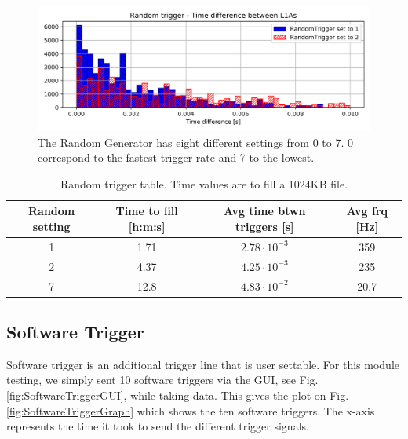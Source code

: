 \begin{figure}[htbp!] 
\centering    
\includegraphics[width=\textwidth]{Raster/RandomTriggerTimeDifferences.png}
\caption[Random Trigger]{The Random Generator has eight different settings from 0 to 7. 0 correspond to the fastest trigger rate and 7 to the lowest.}
\label{fig:RandomGenerator}
\end{figure}

\begin{table}[htbp!] 
\caption{Random trigger table. Time values are to fill a 1024KB file.}
\centering
\label{table:RandomTrigger}
\begin{tabular}{c c c c}
\toprule
Random setting & Time to fill [h:m:s] & Avg time btwn triggers [s] & Avg frq [Hz] \\
\midrule
1 & 1.71 & $2.78\cdot10^{-3}$ & 359 \\
2 & 4.37 & $4.25\cdot10^{-3}$ & 235 \\
7 & 12.8 & $4.83\cdot10^{-2}$ & 20.7 \\
\bottomrule
\end{tabular}
\end{table}

\subsection{Software Trigger}
\label{Software Trigger}

Software trigger is an additional trigger line that is user settable. For this module testing, we simply sent 10 software triggers via the GUI, see Fig. \ref{fig:SoftwareTriggerGUI}, while taking data. This gives the plot on Fig. \ref{fig:SoftwareTriggerGraph} which shows the ten software triggers. The x-axis represents the time it took to send the different trigger signals.

